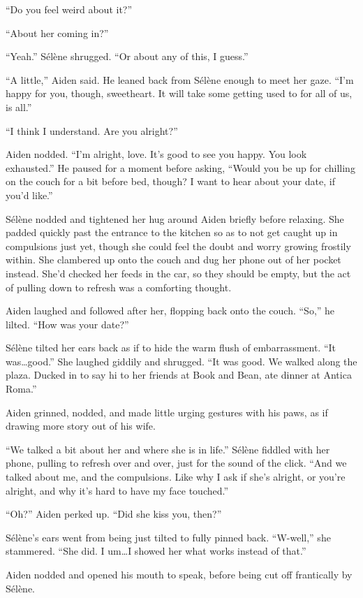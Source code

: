 ``Do you feel weird about it?''

``About her coming in?''

``Yeah.'' Sélène shrugged. ``Or about any of this, I guess.''

``A little,'' Aiden said. He leaned back from Sélène enough to meet her gaze. ``I'm happy for you, though, sweetheart. It will take some getting used to for all of us, is all.''

``I think I understand. Are you alright?''

Aiden nodded. ``I'm alright, love. It's good to see you happy. You look exhausted.'' He paused for a moment before asking, ``Would you be up for chilling on the couch for a bit before bed, though? I want to hear about your date, if you'd like.''

Sélène nodded and tightened her hug around Aiden briefly before relaxing. She padded quickly past the entrance to the kitchen so as to not get caught up in compulsions just yet, though she could feel the doubt and worry growing frostily within. She clambered up onto the couch and dug her phone out of her pocket instead. She'd checked her feeds in the car, so they should be empty, but the act of pulling down to refresh was a comforting thought.

Aiden laughed and followed after her, flopping back onto the couch. ``So,'' he lilted. ``How was your date?''

Sélène tilted her ears back as if to hide the warm flush of embarrassment. ``It was\ldots{}good.'' She laughed giddily and shrugged. ``It was good. We walked along the plaza. Ducked in to say hi to her friends at Book and Bean, ate dinner at Antica Roma.''

Aiden grinned, nodded, and made little urging gestures with his paws, as if drawing more story out of his wife.

``We talked a bit about her and where she is in life.'' Sélène fiddled with her phone, pulling to refresh over and over, just for the sound of the click. ``And we talked about me, and the compulsions. Like why I ask if she's alright, or you're alright, and why it's hard to have my face touched.''

``Oh?'' Aiden perked up. ``Did she kiss you, then?''

Sélène's ears went from being just tilted to fully pinned back. ``W-well,'' she stammered. ``She did. I um\ldots{}I showed her what works instead of that.''

Aiden nodded and opened his mouth to speak, before being cut off frantically by Sélène.

